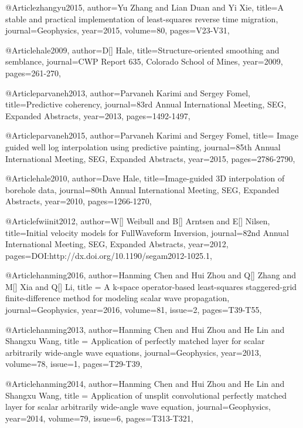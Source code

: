 @Article{zhangyu2015,
  author={Yu Zhang and Lian Duan and Yi Xie},
  title={A stable and practical implementation of least-squares reverse time migration},
  journal={Geophysics},
  year=2015,
  volume=80,
  pages={V23-V31},
}
	




@Article{hale2009,
  author={D[] Hale},
  title={Structure-oriented smoothing and semblance},
  journal={CWP Report 635, Colorado School of Mines},
  year=2009,
  pages={261-270},
}


@Article{parvaneh2013,
  author={Parvaneh Karimi and Sergey Fomel},
  title={Predictive coherency},
  journal={83rd Annual International Meeting, SEG, Expanded Abstracts},
  year=2013,
  pages={1492-1497},
}

@Article{parvaneh2015,
  author={Parvaneh Karimi and Sergey Fomel},
  title={	Image guided well log interpolation using predictive painting},
  journal={85th Annual International Meeting, SEG, Expanded Abstracts},
  year=2015,
  pages={2786-2790},
}

@Article{hale2010,
  author={Dave Hale},
  title={Image-guided 3{D} interpolation of borehole data},
  journal={80th Annual International Meeting, SEG, Expanded Abstracts},
  year=2010,
  pages={1266-1270},
}

@Article{fwiinit2012,
  author={W[] Weibull and B[] Arntsen and E[] Nilsen},
  title={Initial velocity models for FullWaveform Inversion},
  journal={82nd Annual International Meeting, SEG, Expanded Abstracts},
  year=2012,
  pages={DOI:http://dx.doi.org/10.1190/segam2012-1025.1},
}






@Article{hanming2016,
  author={Hanming Chen and Hui Zhou and Q[] Zhang and M[] Xia and Q[] Li},
  title = {A k-space operator-based least-squares staggered-grid finite-difference method for modeling scalar wave propagation},
  journal={Geophysics},
  year=2016,
  volume=81,
  issue=2,
  pages={T39-T55},
}

@Article{hanming2013,
  author={Hanming Chen and Hui Zhou and He Lin and Shangxu Wang},
  title = {Application of perfectly matched layer for scalar arbitrarily wide-angle wave equations},
  journal={Geophysics},
  year=2013,
  volume=78,
  issue=1,
  pages={T29-T39},
}

@Article{hanming2014,
  author={Hanming Chen and Hui Zhou and He Lin and Shangxu Wang},
  title = {Application of unsplit convolutional perfectly matched layer for scalar arbitrarily wide-angle wave equation},
  journal={Geophysics},
  year=2014,
  volume=79,
  issue=6,
  pages={T313-T321},
}

